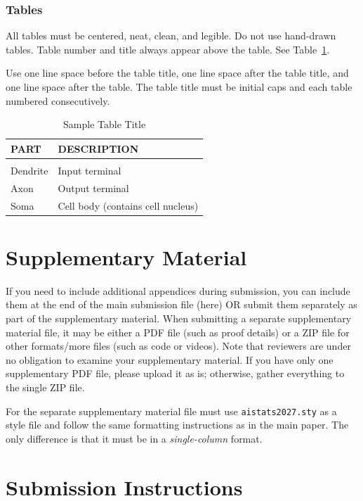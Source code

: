 \documentclass[twoside]{article}
\begin{document}
\subsubsection{Tables}

All tables must be centered, neat, clean, and legible. Do not use hand-drawn tables.
Table number and title always appear above the table.
See Table~\ref{sample-table}.

Use one line space before the table title, one line space after the table title,
and one line space after the table. The table title must be
initial caps and each table numbered consecutively.

\begin{table}[h]
\caption{Sample Table Title} \label{sample-table}
\begin{center}
\begin{tabular}{ll}
\textbf{PART}  &\textbf{DESCRIPTION} \\
\hline \\
Dendrite         &Input terminal \\
Axon             &Output terminal \\
Soma             &Cell body (contains cell nucleus) \\
\end{tabular}
\end{center}
\end{table}

\section{Supplementary Material}

If you need to include additional appendices during submission, you can include them at the end of the main submission file (here) OR submit them separately as part of the supplementary material.
When submitting a separate supplementary material file, it may be either a PDF file (such as proof details) or a ZIP file for other formats/more files (such as code or videos).
Note that reviewers are under no obligation to examine your supplementary material.
If you have only one supplementary PDF file, please upload it as is; otherwise, gather everything to the single ZIP file.

For the separate supplementary material file must use \texttt{aistats2027.sty} as a style file and follow the same formatting instructions as in the main paper.
The only difference is that it must be in a \emph{single-column} format.

\section{Submission Instructions}
\end{document}
